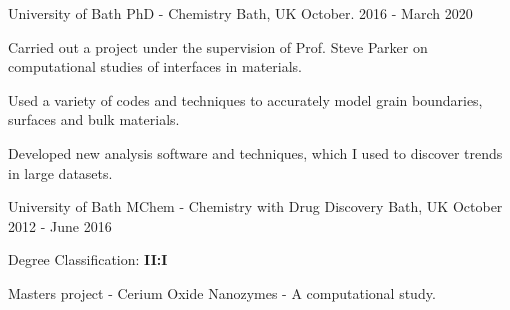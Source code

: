 \begin{cventries}
  \cventry
    {University of Bath}
    {PhD - Chemistry}
    {Bath, UK}
    {October. 2016 - March 2020}
    {
      \begin{cvitems}
        \item {Carried out a project under the supervision of Prof. Steve Parker on computational studies of interfaces in materials}.
        \item {Used a variety of codes and techniques to accurately model grain boundaries, surfaces and bulk materials.}
        \item {Developed new analysis software and techniques, which I used to discover trends in large datasets. }
      \end{cvitems}
    }
\end{cventries}

\begin{cventries}
  \cventry
    {University of Bath}
    {MChem - Chemistry with Drug Discovery}
    {Bath, UK}
    {October 2012 - June 2016}
    {
      \begin{cvitems}
        \item {Degree Classification: \textbf{II:I}}
        \item {Masters project - Cerium Oxide Nanozymes - A computational study.}
      \end{cvitems}
    }
\end{cventries}
